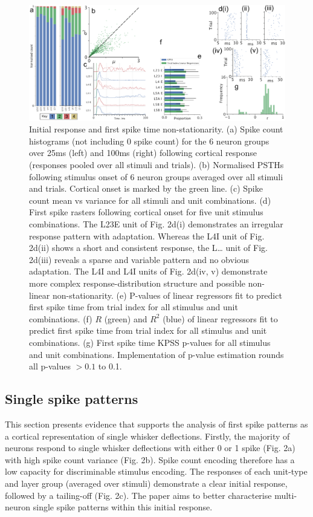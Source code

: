 \documentclass{article}
\begin{document}
\begin{figure}[t!]
\centering
\includegraphics[width=\textwidth]{Figure2.pdf}
\caption{Initial response and first spike time non-stationarity. (a) Spike count histograms (not including 0 spike count) for the 6 neuron groups over 25ms (left) and 100ms (right) following cortical response (responses pooled over all stimuli and trials). (b) Normalised PSTHs following stimulus onset of 6 neuron groups averaged over all stimuli and trials. Cortical onset is marked by the green line. (c) Spike count mean vs variance for all stimuli and unit combinations. (d) First spike rasters following cortical onset for five unit stimulus combinations. The L23E unit of Fig. 2d(i) demonstrates an irregular response pattern with adaptation. Whereas the L4I unit of Fig. 2d(ii) shows a short and consistent response, the L… unit of Fig. 2d(iii) reveals a sparse and variable pattern and no obvious adaptation. The L4I and L4I units of Fig. 2d(iv, v) demonstrate more complex response-distribution structure and possible non-linear non-stationarity. (e) P-values of linear regressors fit to predict first spike time from trial index for all stimulus and unit combinations. (f) $R$ (green) and $R^2$ (blue) of linear regressors fit to predict first spike time from trial index for all stimulus and unit combinations. (g) First spike time KPSS p-values for all stimulus and unit combinations. Implementation of p-value estimation rounds all p-values $>0.1$ to 0.1.}
\label{fig:universe}
\end{figure}


\subsection*{Single spike patterns}

This section presents evidence that supports the analysis of first spike patterns as a cortical representation of single whisker deflections. Firstly, the majority of neurons respond to single whisker deflections with either 0 or 1 spike (Fig. 2a) with high spike count variance (Fig. 2b). Spike count encoding therefore has a low capacity for discriminable stimulus encoding. The responses of each unit-type and layer group (averaged over stimuli) demonstrate a clear initial response, followed by a tailing-off (Fig. 2c). The paper aims to better characterise multi-neuron single spike patterns within this initial response.
\end{document}
